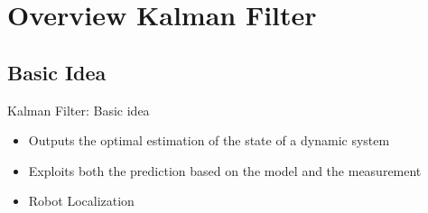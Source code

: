 \section{Overview Kalman Filter} 
\begin{frame}
    \tableofcontents[currentsection]
\end{frame}

\subsection{Basic Idea}
\begin{frame}{Kalman Filter: Basic idea}
\begin{itemize}
    \item Outputs the optimal estimation of the state of a dynamic system
    \item Exploits both the prediction based on the model and the measurement
    \item Robot Localization
\end{itemize}
\end{frame}

